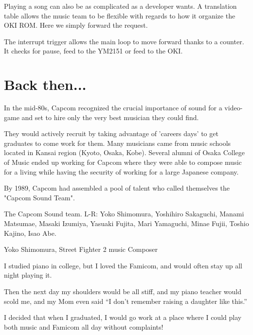 Playing a song can also be as complicated as a developer wants. A translation table allows the music team to be flexible with regards to how it organize the OKI ROM. Here we simply forward the request.

The interrupt trigger allows the main loop to move forward thanks to a counter. It checks for pause, feed to the YM2151 or feed to the OKI.








\section{Back then...}
In the mid-80s, Capcom recognized the crucial importance of sound for a video-game and set to hire only the very best musician they could find.

They would actively recruit by taking advantage of 'careers days' to get graduates to come work for them. Many musicians came from music schools located in Kansai region (Kyoto, Osaka, Kobe). Several alumni of Osaka College of Music ended up working for Capcom where they were able to compose music for a living while having the security of working for a large Japanese company. 

By 1989, Capcom had assembled a pool of talent who called themselves the "Capcom Sound Team".


The Capcom Sound team. L-R: Yoko Shimomura, Yoshihiro Sakaguchi, Manami Matsumae, Masaki Izumiya, Yasuaki Fujita, Mari Yamaguchi, Minae Fujii, Toshio Kajino, Isao Abe.




\begin{q}{Yoko Shimomura, Street Fighter 2 music Composer\cite{beep199010}}

I studied piano in college, but I loved the Famicom, and would often stay up all night playing it. 

Then the next day my shoulders would be all stiff, and my piano teacher would scold me, and my Mom even said “I don’t remember raising a daughter like this.”

I decided that when I graduated, I would go work at a place where I could play both music and Famicom all day without complaints!
\end{q}


